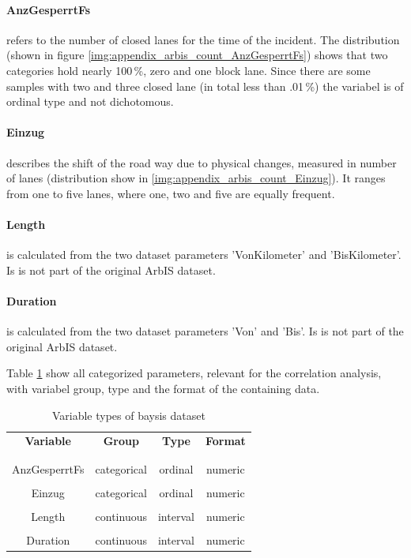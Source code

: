 \documentclass[a4paper,headsepline,footsepline,fontsize=11pt,BCOR=12mm,DIV=12]{report}
\begin{document}
\paragraph{AnzGesperrtFs} refers to the number of closed lanes for the time of the incident. The distribution (shown in figure \ref{img:appendix_arbis_count_AnzGesperrtFs}) shows that two categories hold nearly 100\,\%, zero and one block lane. Since there are some samples with two and three closed lane (in total less than .01\,\%) the variabel is of ordinal type and not dichotomous.

\paragraph{Einzug} describes the shift of the road way due to physical changes, measured in number of lanes (distribution show in \ref{img:appendix_arbis_count_Einzug}). It ranges from one to five lanes, where one, two and five are equally frequent. 

\paragraph{Length} is calculated from the two dataset parameters 'VonKilometer' and 'BisKilometer'. Is is not part of the original ArbIS dataset.

\paragraph{Duration} is calculated from the two dataset parameters 'Von' and 'Bis'. Is is not part of the original ArbIS dataset.

\bigskip

Table \ref{table:table_arbis_paramters} show all categorized parameters, relevant for the correlation analysis, with variabel group, type and the format of the containing data.
	
\begin{table}[ht]
	\centering
	\begin{tabular}{c|c|c|c}
		\textbf{Variable} 	& \textbf{Group} 	& \textbf{Type} 		& \textbf{Format} \\
		\\[-1em]
		\hline
		\\[-1em]
		AnzGesperrtFs  	& categorical 	& ordinal 	& numeric\\
		\hline
		\\[-1em]
		Einzug  		& categorical 	& ordinal 	& numeric\\
		\hline
		\\[-1em]
		Length  		& continuous 	& interval 	& numeric\\
		\hline
		\\[-1em]
		Duration  		& continuous 	& interval 	& numeric\\
	\end{tabular}
	\caption{Variable types of \acrshort{baysis} dataset}
	\label{table:table_arbis_paramters}
\end{table}
\end{document}
